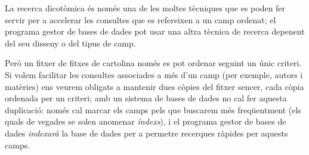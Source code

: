 La recerca dicotòmica és només una de les moltes tècniques que es
poden fer servir per a accelerar les consultes que es refereixen a un
camp ordenat; el programa gestor de bases de dades pot usar una altra
tècnica de recerca depenent del seu disseny o del tipus de camp.

Però un fitxer de fitxes de cartolina només es pot ordenar seguint un
únic criteri. Si volem facilitar les consultes associades a més d'un
camp (per exemple, autors i matèries) ens veurem obligats a mantenir
dues còpies del fitxer sencer, cada còpia ordenada per un criteri; amb
un sistema de bases de dades no cal fer aquesta duplicació: només cal
marcar els camps pels que buscarem més freqüentment (els quals de
vegades se solen anomenar \emph{índexs}), i el programa gestor de
bases de dades \emph{indexarà} la base de dades per a permetre
recerques ràpides per aquests camps.


